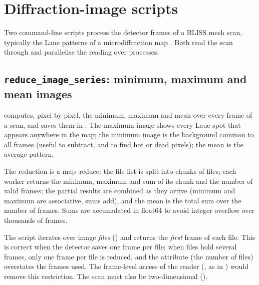 \section{Diffraction-image scripts}\label{sec:images}

Two command-line scripts process the detector frames of a BLISS mesh scan, typically the
Laue patterns of a microdiffraction map \citep{Ulrich2011}. Both read the scan through
 and parallelise the reading over processes.

\subsection{\texttt{reduce\_image\_series}: minimum, maximum and mean images}

 computes, pixel by pixel, the minimum, maximum and mean over every frame of a scan,
and saves them in . The maximum image shows every Laue spot
that appears anywhere in the map; the minimum image is the background common to all frames
(useful to subtract, and to find hot or dead pixels); the mean is the average pattern.

The reduction is a map--reduce: the file list is split into chunks of  files;
each worker returns the minimum, maximum and sum of its chunk and the number of valid frames;
the partial results are combined as they arrive (minimum and maximum are associative, sums
add), and the mean is the total sum over the number of frames. Sums are accumulated in
float64 to avoid integer overflow over thousands of frames.

\begin{issue}
The script iterates over image \emph{files} () and
 returns the \emph{first} frame of each file. This is correct when the
detector saves one frame per file; when files hold several frames, only one frame per file is
reduced, and the  attribute (the number of files) overstates the frames
used. The frame-level access of the reader (, as in
) would remove this restriction. The scan must also be
two-dimensional ().
\end{issue}

